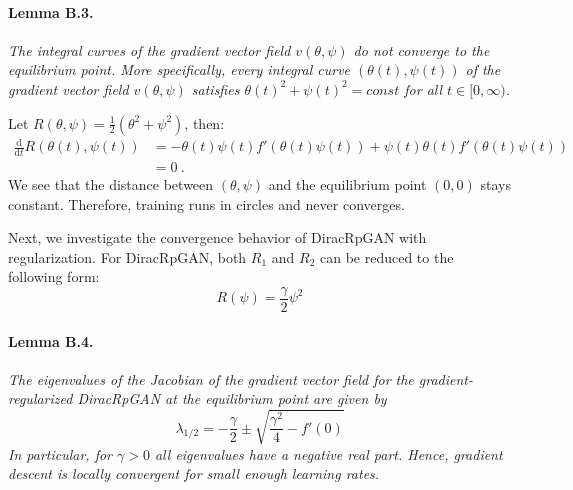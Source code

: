 \paragraph{Lemma B.3.} \emph{The integral curves of the gradient vector field $v(\theta, \psi)$ do not converge to the equilibrium point. More specifically, every integral curve $(\theta(t), \psi(t))$ of the gradient vector field $v(\theta, \psi)$ satisfies $\theta(t)^2 + \psi(t)^2 = const$ for all $t \in [0, \infty)$.}

Let $R(\theta, \psi) = \frac{1}{2} (\theta^2 + \psi^2)$, then:
\begin{align}
    \frac{\mathrm{d}}{\mathrm{d}t} R(\theta(t), \psi(t)) \nonumber &= -\theta(t) \psi(t) f'(\theta(t) \psi(t)) + \psi(t) \theta(t) f'(\theta(t) \psi(t)) \nonumber \\
    &= 0\ .
\end{align}
We see that the distance between $(\theta, \psi)$ and the equilibrium point $(0,0)$ stays constant. Therefore, training runs in circles and never converges.

Next, we investigate the convergence behavior of DiracRpGAN with regularization. For DiracRpGAN, both $R_1$ and $R_2$ can be reduced to the following form:
\begin{equation}
    R(\psi) = \frac{\gamma}{2} \psi^2
\end{equation}

\paragraph{Lemma B.4.} \emph{The eigenvalues of the Jacobian of the gradient vector field for the gradient-regularized DiracRpGAN at the equilibrium point are given by
\begin{equation}
\label{eq:ev}
    \lambda_{1/2} = -\frac{\gamma}{2} \pm \sqrt{\frac{\gamma^2}{4}-f'(0)}
\end{equation}
In particular, for $\gamma > 0$ all eigenvalues have a negative real part. Hence, gradient descent is locally convergent for small enough learning rates.}


